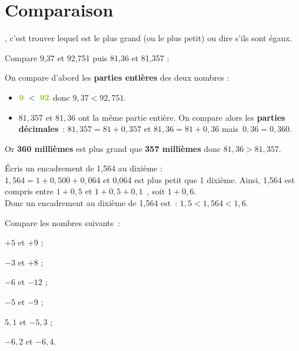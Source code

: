 
\newpage

\section{Comparaison}

\vspace{4em}

\begin{aconnaitre}
, c'est trouver lequel est le plus grand (ou le plus petit) ou dire s'ils sont égaux.
\end{aconnaitre}

\vspace{4em}

\begin{methode*1}


\begin{exemple*1}
Compare 9,37 et 92,751 puis 81,36 et 81,357 :

On compare d'abord les \textbf{\textcolor{H1}{parties entières}} des deux nombres :
\begin{itemize}
 \item $\textbf{\textcolor{H1}{9}} < \textbf{\textcolor{H1}{92}}$ donc $9,37 < 92,751$.
 \item $81,357$ et $81,36$ ont la même partie entière. On compare alors les \textbf{\textcolor{B2}{parties décimales}} : $81,357 = 81+0,357$ et $81,36=81+0,36$ mais $0,36=0,360$.
 \end{itemize}
Or \textbf{\textcolor{B2}{360 millièmes}} est plus grand que \textbf{\textcolor{B2}{357 millièmes}} donc $81,36 > 81,357$.
\end{exemple*1}


\begin{exemple*1}
Écris un encadrement de 1,564 au dixième : \\[0.5em]
$1,564 = 1 + 0,500 + 0,064$ et 0,064 est plus petit que 1 dixième. Ainsi, 1,564 est compris entre $1 + 0,5$ et $1 + 0,5 + 0,1$ , soit $1 + 0,6$. \\[0.5em]
Donc un encadrement au dixième de 1,564 est : $1,5 < 1,564 < 1,6$.
\end{exemple*1}

\exercice
Compare les nombres suivants :
\begin{colenumerate}{3}
 \item $+5$ et $+9$ ;
 \item $-3$ et $+8$ ;
 \item $-6$ et $-12$ ;
 \item $-5$ et $-9$ ;
 \item $5,1$ et $-5,3$ ;
 \item $-6,2$ et $-6,4$.
 \end{colenumerate}

\end{methode*1}


